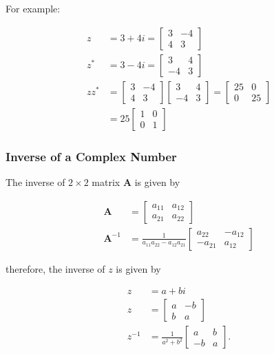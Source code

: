\documentclass[10pt]{article}
\begin{document}
For example:

$$
\begin{aligned}
z & =3+4 i=\left[\begin{array}{cc}
3 & -4 \\
4 & 3
\end{array}\right] \\
z^{*} & =3-4 i=\left[\begin{array}{cc}
3 & 4 \\
-4 & 3
\end{array}\right] \\
z z^{*} & =\left[\begin{array}{cc}
3 & -4 \\
4 & 3
\end{array}\right]\left[\begin{array}{cc}
3 & 4 \\
-4 & 3
\end{array}\right]=\left[\begin{array}{cc}
25 & 0 \\
0 & 25
\end{array}\right] \\
& =25\left[\begin{array}{cc}
1 & 0 \\
0 & 1
\end{array}\right]
\end{aligned}
$$

\subsubsection{Inverse of a Complex Number}
The inverse of $2 \times 2$ matrix $\mathbf{A}$ is given by

$$
\begin{aligned}
\mathbf{A} & =\left[\begin{array}{ll}
a_{11} & a_{12} \\
a_{21} & a_{22}
\end{array}\right] \\
\mathbf{A}^{-1} & =\frac{1}{a_{11} a_{22}-a_{12} a_{21}}\left[\begin{array}{cc}
a_{22} & -a_{12} \\
-a_{21} & a_{12}
\end{array}\right]
\end{aligned}
$$

therefore, the inverse of $z$ is given by

$$
\begin{aligned}
z & =a+b i \\
z & =\left[\begin{array}{cc}
a & -b \\
b & a
\end{array}\right] \\
z^{-1} & =\frac{1}{a^{2}+b^{2}}\left[\begin{array}{cc}
a & b \\
-b & a
\end{array}\right] .
\end{aligned}
$$
\end{document}
